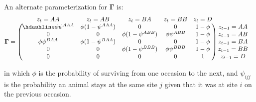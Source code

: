 \documentclass[
  12pt,
]{krantz}
\begin{document}
An alternate parameterization for \(\mathbf{\Gamma}\) is:
\[\begin{matrix}
& \\
\mathbf{\Gamma} =
\left ( \vphantom{ \begin{matrix} 12 \\ 12 \\ 12 \\ 12 \\ 12\end{matrix} } \right .
\end{matrix}
\hspace{-1.2em}
\begin{matrix}
z_t=AA & z_t=AB & z_t=BA & z_t=BB & z_t=D \\ \hdashline
\phi \psi^{AAA} & \phi (1 - \psi^{AAA}) & 0 & 0 & 1 - \phi\\
0 & 0 & \phi (1 - \psi^{ABB}) & \phi \psi^{ABB} & 1 - \phi\\
\phi \psi^{BAA} & \phi (1 - \psi^{BAA}) & 0 & 0 & 1 - \phi\\
0 & 0 & \phi (1-\psi^{BBB}) & \phi \psi^{BBB} & 1 - \phi\\
0 & 0 & 0 & 0 & 1
\end{matrix}
\hspace{-0.2em}
\begin{matrix}
& \\
\left . \vphantom{ \begin{matrix} 12 \\ 12 \\ 12 \\ 12 \\ 12\end{matrix} } \right )
\begin{matrix}
z_{t-1}=AA \\ z_{t-1}=AB \\ z_{t-1}=BA \\ z_{t-1}=BB \\ z_{t-1}=D
\end{matrix}
\end{matrix}\]

in which \(\phi\) is the probability of surviving from one occasion to the next, and \(\psi_{ijj}\) is the probability an animal stays at the same site \(j\) given that it was at site \(i\) on the previous occasion.
\end{document}
